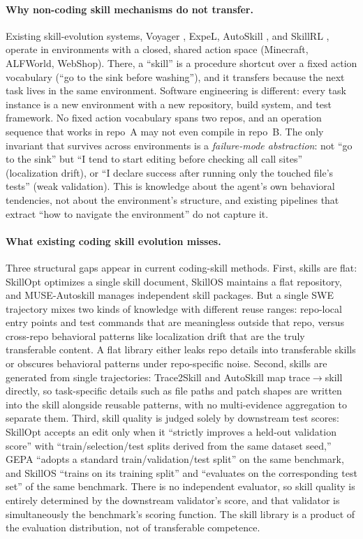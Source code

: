 \paragraph{Why non-coding skill mechanisms do not transfer.}
Existing skill-evolution systems, Voyager \citep{voyager2023}, ExpeL, AutoSkill
\citep{autoskill2023}, and SkillRL \citep{skillrl2026}, operate in environments
with a closed, shared action space (Minecraft, ALFWorld, WebShop). There, a
``skill'' is a procedure shortcut over a fixed action vocabulary (``go to the
sink before washing''), and it transfers because the next task lives in the
same environment. Software engineering is different: every task instance is a
new environment with a new repository, build system, and test framework. No
fixed action vocabulary spans two repos, and an operation sequence that works
in repo~A may not even compile in repo~B. The only invariant that survives
across environments is a \emph{failure-mode abstraction}: not ``go to the
sink'' but ``I tend to start editing before checking all call sites''
(localization drift), or ``I declare success after running only the touched
file's tests'' (weak validation). This is knowledge about the agent's own
behavioral tendencies, not about the environment's structure, and existing
pipelines that extract ``how to navigate the environment'' do not capture it.

\paragraph{What existing coding skill evolution misses.}
Three structural gaps appear in current coding-skill methods. First, skills are
flat: SkillOpt \citep{skillopt2024} optimizes a single skill document, SkillOS
\citep{skillos2025} maintains a flat repository, and MUSE-Autoskill manages
independent skill packages. But a single SWE trajectory mixes two kinds of
knowledge with different reuse ranges: repo-local entry points and test
commands that are meaningless outside that repo, versus cross-repo behavioral
patterns like localization drift that are the truly transferable content. A
flat library either leaks repo details into transferable skills or obscures
behavioral patterns under repo-specific noise. Second, skills are generated
from single trajectories: Trace2Skill \citep{trace2skill2024} and AutoSkill
\citep{autoskill2023} map trace$\to$skill directly, so task-specific details
such as file paths and patch shapes are written into the skill alongside
reusable patterns, with no multi-evidence aggregation to separate them.
Third, skill quality is judged solely by downstream test scores: SkillOpt
accepts an edit only when it ``strictly improves a held-out validation score''
with ``train/selection/test splits derived from the same dataset seed,'' GEPA
\citep{gepa2026} ``adopts a standard train/validation/test split'' on the same
benchmark, and SkillOS ``trains on its training split'' and ``evaluates on the
corresponding test set'' of the same benchmark. There is no independent
evaluator, so skill quality is entirely determined by the downstream
validator's score, and that validator is simultaneously the benchmark's scoring
function. The skill library is a product of the evaluation distribution, not of
transferable competence.

